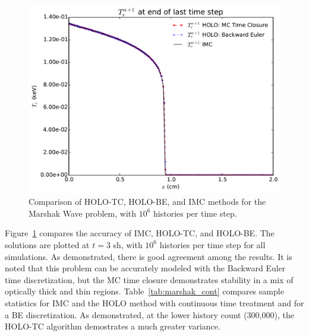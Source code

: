 \documentclass{anstrans}
\begin{document}
\begin{figure}[H]
    \centering
    \includegraphics[width=\linewidth]{marshak_time_cont_compare.pdf}
    \caption{\label{fig:marshak_tc} Comparison of HOLO-TC, HOLO-BE, and IMC methods for
the Marshak Wave problem, with $10^6$ histories per time step.}
\end{figure}

Figure~\ref{fig:marshak_tc} compares the accuracy of IMC, HOLO-TC, and HOLO-BE.  The
solutions are plotted at $t=3$ sh, with $10^6$ histories per time step for all
simulations. As demonstrated, there is good agreement among the results.  It is noted that
this problem can be accurately modeled with the Backward Euler time discretization, but
the MC time closure demonstrates stability in a mix of optically thick and thin
regions. Table~\ref{tab:marshak_cont} compares sample statistics for IMC and
the HOLO method with continuous time treatment and for a BE discretization.  As
demonstrated, at the lower history count (300,000), the HOLO-TC algorithm demostrates a
much greater variance.  
\end{document}
